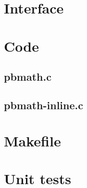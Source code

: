 \section{Interface}

\begin{scriptsize}
\begin{ttfamily}

\end{ttfamily}
\end{scriptsize}

\section{Code}

\subsection{pbmath.c}

\begin{scriptsize}
\begin{ttfamily}

\end{ttfamily}
\end{scriptsize}

\subsection{pbmath-inline.c}

\begin{scriptsize}
\begin{ttfamily}

\end{ttfamily}
\end{scriptsize}

\section{Makefile}

\begin{scriptsize}
\begin{ttfamily}

\end{ttfamily}
\end{scriptsize}

\section{Unit tests}

\begin{scriptsize}
\begin{ttfamily}

\end{ttfamily}
\end{scriptsize}

